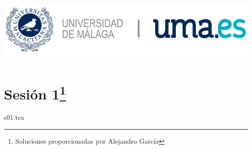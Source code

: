 \documentclass[12pt, a4paper]{article}
\begin{document}
\begin{titlepage}
\vspace*{\fill}

\vspace*{\fill}

\includegraphics[scale=0.25]{Logo_UMA.jpg}

\vspace*{\fill}
\end{titlepage}


\section{Sesión 1\footnote{Soluciones proporcionadas por Alejandro García}}
%
{s01.tex}
\end{document}
